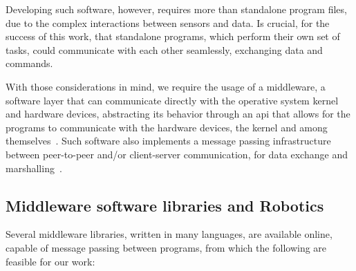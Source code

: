 Developing such software, however, requires more than standalone program files, due to the complex interactions between sensors and data. Is crucial, for the success of this work, that standalone programs, which perform their own set of tasks, could communicate with each other seamlessly, exchanging data and commands.

With those considerations in mind, we require the usage of a middleware, a software layer that can communicate directly with the operative system kernel and hardware devices, abstracting its behavior through an \ac{api} that allows for the programs to communicate with the hardware devices, the kernel and among themselves~\cite{Etzkorn2017, Huang2010}. Such software also implements a message passing infrastructure between peer-to-peer and/or client-server communication, for data exchange and marshalling~\cite{Etzkorn2017}.

\subsection{Middleware software libraries and Robotics} 
Several middleware libraries, written in many languages, are available online, capable of message passing between programs, from which the following are feasible for our work:

